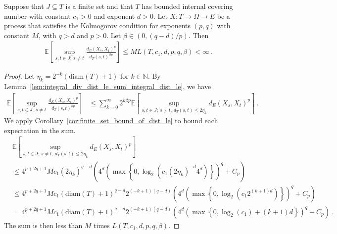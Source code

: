 \begin{lemma}\label{lem:finite_set_bound}
  \leanok
Suppose that $J \subseteq T$ is a finite set and that $T$ has bounded internal covering number with constant $c_1>0$ and exponent $d > 0$.
Let $X : T \to \Omega \to E$ be a process that satisfies the Kolmogorov condition for exponents $(p,q)$ with constant $M$, with $q > d$ and $p > 0$.
Let $\beta \in(0, (q - d)/p)$.
Then
\begin{align*}
  \mathbb{E}\left[ \sup_{s, t \in J;\: s \ne t} \frac{d_E(X_s, X_t)^p}{d_T(s, t)^{\beta p}} \right]
  \le M L(T, c_1, d, p, q, \beta)
  < \infty
  \: .
\end{align*}
\end{lemma}

\begin{proof}
Let $\eta_k = 2^{-k}(\mathrm{diam}(T) + 1)$ for $k \in \mathbb{N}$.
By Lemma~\ref{lem:integral_div_dist_le_sum_integral_dist_le}, we have
\begin{align*}
  \mathbb{E}\left[ \sup_{s, t \in J;\: s \ne t} \frac{d_E(X_s, X_t)^p}{d_T(s, t)^{\beta p}} \right]
  &\le \sum_{k=0}^\infty 2^{k \beta p} \mathbb{E}\left[ \sup_{s, t \in J;\: s \ne t, \: d_T(s, t) \le 2 \eta_k} d_E(X_s, X_t)^p \right]
  \: .
\end{align*}
We apply Corollary~\ref{cor:finite_set_bound_of_dist_le} to bound each expectation in the sum.
\begin{align*}
  &\mathbb{E}\left[ \sup_{s, t \in J;\: s \ne t, \: d_T(s, t) \le 2 \eta_k} d_E(X_s, X_t)^p \right]
  \\
  &\le 4^{p+2q+1} M c_1 (2 \eta_k)^{q-d} \left(4^d \left(\max\left\{0, \log_2 \left(c_1 (2 \eta_k)^{-d} 4^d \right) \right\} \right)^q
    + C_p\right)
  \\
  &\le 4^{p+2q+1} M c_1 (\mathrm{diam}(T)+1)^{q-d} 2^{(-k + 1)(q-d)} \left(4^d \left(\max\left\{0, \log_2 \left(c_1 2^{(k + 1)d} \right) \right\} \right)^q
    + C_p\right)
  \\
  &= 4^{p+2q+1} M c_1 (\mathrm{diam}(T)+1)^{q-d} 2^{(-k + 1)(q-d)} \left(4^d \left(\max\left\{0, \log_2(c_1) + (k + 1)d \right\} \right)^q
    + C_p\right)
  \: .
\end{align*}
The sum is then less than $M$ times $L(T, c_1, d, p, q, \beta)$.
\end{proof}


